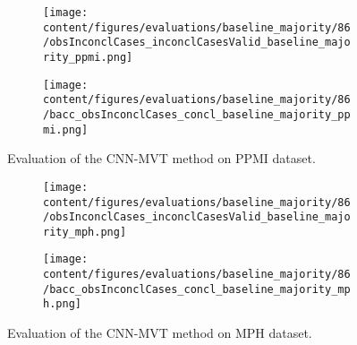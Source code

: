 \begin{figure}[t]
  \begin{subfigure}{0.9\textwidth}
    \centering
    \texttt{[image: content/figures/evaluations/baseline\_majority/86/obsInconclCases\_inconclCasesValid\_baseline\_majority\_ppmi.png]}
    \label{fig:obsInconclCases_inconclCasesValid_baseline_majority_ppmi}
  \end{subfigure}
  \hfill
  \begin{subfigure}{0.9\textwidth}
    \centering
    \texttt{[image: content/figures/evaluations/baseline\_majority/86/bacc\_obsInconclCases\_concl\_baseline\_majority\_ppmi.png]}
    \label{fig:bacc_obsInconclCases_concl_baseline_majority_ppmi}
  \end{subfigure}
  \caption{Evaluation of the CNN-MVT method on PPMI dataset.}
\end{figure}




\begin{figure}[t]
  \begin{subfigure}{0.9\textwidth}
    \centering
    \texttt{[image: content/figures/evaluations/baseline\_majority/86/obsInconclCases\_inconclCasesValid\_baseline\_majority\_mph.png]}
    \label{fig:obsInconclCases_inconclCasesValid_baseline_majority_mph}
  \end{subfigure}
  \hfill
  \begin{subfigure}{0.9\textwidth}
    \centering
    \texttt{[image: content/figures/evaluations/baseline\_majority/86/bacc\_obsInconclCases\_concl\_baseline\_majority\_mph.png]}
    \label{fig:bacc_obsInconclCases_concl_baseline_majority_mph}
  \end{subfigure}
  \caption{Evaluation of the CNN-MVT method on MPH dataset.}
\end{figure}


